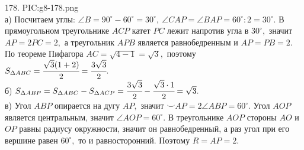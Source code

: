 178. {{PIC:g8-178.png}}\\
а) Посчитаем углы: $\angle B=90^\circ-60^\circ=30^\circ,\ \angle CAP=\angle BAP=60^\circ:2=30^\circ.$ В прямоугольном треугольнике $ACP$ катет $PC$ лежит напротив угла в $30^\circ,$ значит $AP=2PC=2,$ а треугольник $APB$ является равнобедренным и $AP=PB=2.$ По теореме Пифагора $AC=\sqrt{4-1}=\sqrt{3},$ поэтому $S_{\Delta ABC}=\cfrac{\sqrt{3}(1+2)}{2}=\cfrac{3\sqrt{3}}{2}.$\\
б) $S_{\Delta ABP}=S_{\Delta ABC}-S_{\Delta ACP}=\cfrac{3\sqrt{3}}{2}-\cfrac{\sqrt{3}\cdot1}{2}=\sqrt{3}.$\\
в) Угол $ABP$ опирается на дугу $AP,$ значит $\smile AP=2\angle ABP=60^\circ.$ Угол $AOP$ является центральным, значит $\angle AOP=60^\circ.$ В треугольнике $AOP$ стороны $AO$ и $OP$ равны радиусу окружности, значит он равнобедренный, а раз угол при его вершине равен $60^\circ,$ то и равносторонний. Поэтому $R=AP=2.$\\

